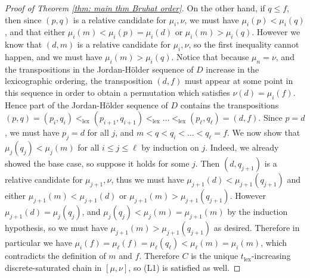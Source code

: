 \documentclass[oneside,11pt,reqno]{amsart}
\theoremstyle{definition}
\newtheorem{proof techniques}{Proof Techniques}
\begin{document}
\begin{proof}[Proof of Theorem \ref{thm: main thm Bruhat order}]
On the other hand, if $q \leq f$, then since $(p , q)$ is a relative candidate for $\mu_i , \nu$, we must have $\mu_i(p) < \mu_i(q)$, and that either $\mu_i(m) < \mu_i(p) = \mu_i(d)$ or $\mu_i(m) > \mu_i(q)$. However we know that $(d , m)$ is a relative candidate for $\mu_i , \nu$, so the first inequality cannot happen, and we must have $\mu_i(m) > \mu_i(q)$. Notice that because $\mu_n = \nu$, and the transpositions in the Jordan-H\"{o}lder sequence of $D$ increase in the lexicographic ordering, the transposition $(d , f)$ must appear at some point in this sequence in order to obtain a permutation which satisfies $\nu(d) = \mu_i(f)$. Hence part of the Jordan-H\"{o}lder sequence of $D$ contains the transpositions $(p , q) = (p_i , q_i) <_\text{lex} (p_{i + 1}, q_{i + 1}) <_\text{lex} \ldots <_\text{lex} (p_\ell , q_\ell) = (d , f)$. Since $p = d$, we must have $p_j = d$ for all $j$, and $m < q < q_i < \ldots < q_\ell = f$. We now show that $\mu_j(q_j) < \mu_j(m)$ for all $i \leq j \leq \ell$ by induction on $j$. Indeed, we already showed the base case, so suppose it holds for some $j$. Then $(d , q_{j + 1})$ is a relative candidate for $\mu_{j + 1} , \nu$, thus we must have $\mu_{j + 1}(d) < \mu_{j + 1}(q_{j + 1})$ and either $\mu_{j + 1}(m) < \mu_{j + 1}(d)$ or $\mu_{j + 1}(m) > \mu_{j + 1}(q_{j + 1})$. However $\mu_{j + 1}(d) = \mu_j(q_j)$, and $\mu_j(q_j) < \mu_j(m) = \mu_{j + 1}(m)$ by the induction hypothesis, so we must have $\mu_{j + 1}(m) > \mu_{j + 1}(q_{j + 1})$ as desired. Therefore in particular we have $\mu_i(f) = \mu_\ell(f) = \mu_\ell(q_\ell) < \mu_\ell(m) = \mu_i(m)$, which contradicts the definition of $m$ and $f$. Therefore $C$ is the unique $t_\text{lex}$-increasing discrete-saturated chain in $[\mu , \nu]$, so (L1) is satisfied as well. 
\end{proof}









\end{document}
